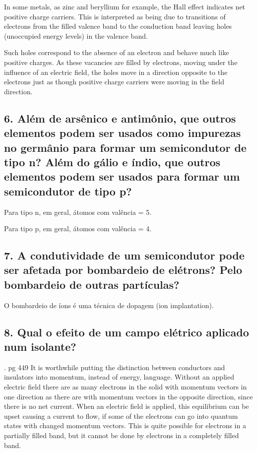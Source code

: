 \documentclass{article}
\begin{document}
In some metals, as zinc and beryllium for example, the Hall effect indicates net positive charge carriers. This is interpreted as being due to transitions of electrons from the filled valence band to the conduction band leaving holes (unoccupied energy levels) in the valence band. 

Such holes correspond to the absence of an electron and behave much like positive charges. As these vacancies are filled by electrons, moving under the influence of an electric field, the holes move in a direction opposite to the electrons just as though positive charge carriers were moving in the field direction.

\subsection{6. Além de arsênico e antimônio, que outros elementos podem ser usados como  impurezas no germânio para formar um semicondutor de tipo n? Além do gálio e índio,  que outros elementos podem ser usados para formar um semicondutor de tipo p? }
Para tipo n, em geral, átomos com valência = 5.

Para tipo p, em geral, átomos com valência = 4.


\subsection{7. A condutividade de um semicondutor pode ser afetada por bombardeio de elétrons?  Pelo bombardeio de outras partículas? }
O bombardeio de íons é uma técnica de dopagem (ion implantation).

\subsection{8. Qual o efeito de um campo elétrico aplicado num isolante? }
. pg 449
It is worthwhile putting the distinction between conductors and insulators into momentum, instead of energy, language. Without an applied electric field there are as many electrons in the solid with momentum vectors in one direction as there are with momentum vectors in the opposite direction, since there is no net current. When an electric field is applied, this equilibrium can be upset causing a current to flow, if some of the electrons can go into quantum states with changed momentum vectors. This is quite possible for electrons in a partially filled band, but it cannot be done by electrons in a completely filled band.
\end{document}
